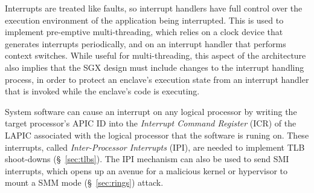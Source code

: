 Interrupts are treated like faults, so interrupt handlers have full control
over the execution environment of the application being interrupted. This is
used to implement pre-emptive multi-threading, which relies on a clock device
that generates interrupts periodically, and on an interrupt handler that
performs context switches. While useful for multi-threading, this aspect of the
architecture also implies that the SGX design must include changes to the
interrupt handling process, in order to protect an enclave's execution state
from an interrupt handler that is invoked while the enclave's code is
executing.

System software can cause an interrupt on any logical processor by writing the
target processor's APIC ID into the \textit{Interrupt Command Register} (ICR)
of the LAPIC associated with the logical processor that the software is runing
on. These interrupts, called \textit{Inter-Processor Interrupts} (IPI), are
needed to implement TLB shoot-downs (\S~\ref{sec:tlbs}). The IPI mechanism can
also be used to send SMI interrupts, which opens up an avenue for a malicious
kernel or hypervisor to mount a SMM mode (\S~\ref{sec:rings}) attack.
